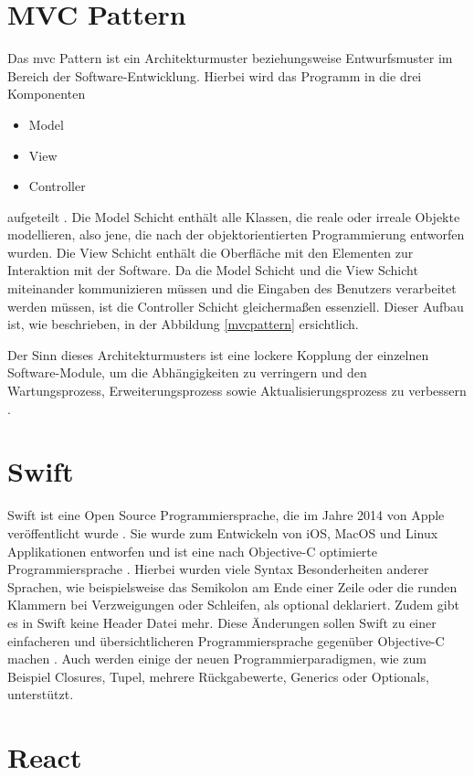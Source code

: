\clearpage

\section{MVC Pattern}\label{mvc}
Das \gls{mvc} Pattern ist ein Architekturmuster beziehungsweise Entwurfsmuster im Bereich der Software-Entwicklung. 
Hierbei wird das Programm in die drei Komponenten
\begin{itemize}
	\item Model
	\item View
	\item Controller
\end{itemize}
aufgeteilt \cite[S.~18]{spring-book-3}. Die Model Schicht enthält alle Klassen, die reale oder irreale Objekte modellieren, also jene, die nach der objektorientierten Programmierung entworfen wurden. Die View Schicht enthält die Oberfläche mit den Elementen zur Interaktion mit der Software. Da die Model Schicht und die View Schicht miteinander kommunizieren müssen und die Eingaben des Benutzers verarbeitet werden müssen, ist die Controller Schicht gleichermaßen essenziell. Dieser Aufbau ist, wie beschrieben, in der Abbildung \ref{mvcpattern} ersichtlich.


Der Sinn dieses Architekturmusters ist eine lockere Kopplung der einzelnen Software-Module, um die Abhängigkeiten zu verringern und den Wartungsprozess, Erweiterungsprozess sowie Aktualisierungsprozess zu verbessern \cite[S.~18]{spring-book-3}.

\section{Swift}
Swift ist eine Open Source Programmiersprache, die im Jahre 2014 von Apple veröffentlicht wurde \cite{swift}. Sie wurde zum Entwickeln von iOS, MacOS und Linux Applikationen entworfen und ist eine nach Objective-C optimierte Programmiersprache \cite{swift}.
Hierbei wurden viele Syntax Besonderheiten anderer Sprachen, wie beispielsweise das Semikolon am Ende einer Zeile oder die runden Klammern bei Verzweigungen oder Schleifen, als optional deklariert. Zudem gibt es in Swift keine Header Datei mehr. Diese Änderungen sollen Swift zu einer einfacheren und übersichtlicheren Programmiersprache gegenüber Objective-C machen  \cite{swift}. Auch werden einige der neuen Programmierparadigmen, wie zum Beispiel Closures, Tupel, mehrere Rückgabewerte, Generics oder Optionals, unterstützt.

\section{React}

\clearpage
